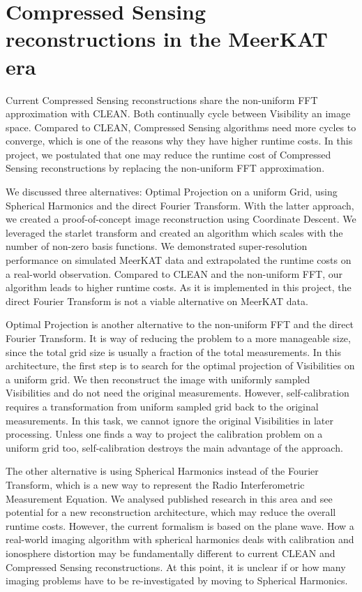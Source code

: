 \section{Compressed Sensing reconstructions in the MeerKAT era}
Current Compressed Sensing reconstructions share the non-uniform FFT approximation with CLEAN. Both continually cycle between Visibility an image space. Compared to CLEAN, Compressed Sensing algorithms need more cycles to converge, which is one of the reasons why they have higher runtime costs. In this project, we postulated that one may reduce the runtime cost of Compressed Sensing reconstructions by replacing the non-uniform FFT approximation. 



We discussed three alternatives: Optimal Projection on a uniform Grid, using Spherical Harmonics and the direct Fourier Transform. With the latter approach, we created a proof-of-concept image reconstruction using  Coordinate Descent. We leveraged the starlet transform and created an algorithm which scales with the number of non-zero basis functions. We demonstrated super-resolution performance on simulated MeerKAT data and extrapolated the runtime costs on a real-world observation. Compared to CLEAN and the non-uniform FFT, our algorithm leads to higher runtime costs. As it is implemented in this project, the direct Fourier Transform is not a viable alternative on MeerKAT data.

Optimal Projection is another alternative to the non-uniform FFT and the direct Fourier Transform. It is way of reducing the problem to a more manageable size, since the total grid size is usually a fraction of the total measurements. In this architecture, the first step is to search for the optimal projection of Visibilities on a uniform grid. We then reconstruct the image with uniformly sampled Visibilities and do not need the original measurements. However, self-calibration requires a transformation from uniform sampled grid back to the original measurements. In this task, we cannot ignore the original Visibilities in later processing. Unless one finds a way to project the calibration problem on a uniform grid too, self-calibration destroys the main advantage of the approach.

The other alternative is using Spherical Harmonics instead of the Fourier Transform, which is a new way to represent the Radio Interferometric Measurement Equation. We analysed published research in this area\cite{carozzi2015imaging, mcewen2008simulating} and see potential for a new reconstruction architecture, which may reduce the overall runtime costs. However, the current formalism\cite{smirnov2011revisiting} is based on the plane wave. How a real-world imaging algorithm with spherical harmonics deals with calibration and ionosphere distortion may be fundamentally different to current CLEAN and Compressed Sensing reconstructions. At this point, it is unclear if or how many imaging problems have to be re-investigated by moving to Spherical Harmonics.

